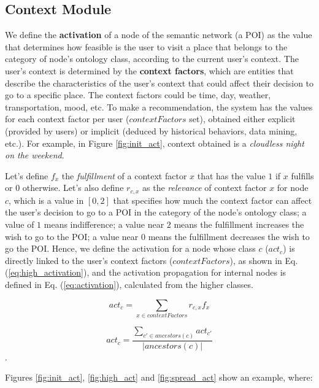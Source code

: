 \subsection{Context Module}
We define the \textbf{activation} of a node of the semantic network (a POI) as the value that determines how feasible 
is the user to visit a place that belongs to the category of  node's ontology class, according to the current user's context.
The user's context is determined by the \textbf{context factors}, which are entities that describe the characteristics of the user’s context that could affect their decision to go to a specific place. The context factors could be time, day, weather, transportation, mood, etc. To make a recommendation, the system has the
values for each context factor per user ($contextFactors$ set), obtained either explicit (provided by users) or implicit (deduced by historical behaviors, data mining, etc.).  For example, in Figure \ref{fig:init_act}, context obtained is a \textit{cloudless night on the weekend}.

Let's define $f_x$ the \textit{fulfillment} of a context factor $x$ that has the value $1$ if $x$ fulfills or $0$ otherwise. Let's also define $r_{c,x}$ as the \textit{relevance} of context factor $x$ for node $c$, which is a value in $[0, 2]$ that specifies how much the context factor can affect the user's decision to go to a POI in the category of the node's ontology class; a value of $1$ means indifference; a value near $2$ means the fulfillment increases the wish to go to the POI; a value near $0$ means the fulfillment decreases the wish to go the POI. Hence, we define the activation for a node whose class $c$ ($act_c$) is directly linked to the user's context factors ($contextFactors$), as shown in Eq. (\ref{eq:high_activation}), and the activation propagation for internal nodes is defined in Eq. (\ref{eq:activation}), calculated from the higher classes.


\begin{equation} \label{eq:high_activation}
    act_c = \sum_{x \in contextFactors} r_{c,x} f_x
\end{equation}


\begin{equation} \label{eq:activation}
    act_c = \frac{\displaystyle \sum_{c' \in ancestors(c)} act_{c'}}{|ancestors(c)|}
\end{equation}.

Figures \ref{fig:init_act}, \ref{fig:high_act} and \ref{fig:spread_act} show an example, where:

